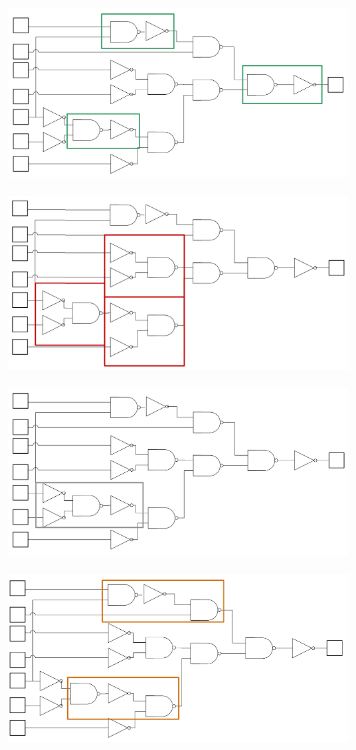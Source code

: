 \documentclass{article}
\begin{document}
\vspace{1cm}
\begin{minipage}[t]{0.5\textwidth}
    \centering
    \includegraphics[width=9cm, scale=1]{S4/and2_pattern.PNG}
    \captionsetup{justification=centering}
\end{minipage}%
\begin{minipage}[t]{0.5\textwidth}
    \centering
    \includegraphics[width=9cm, scale=1]{S4/or2_pattern.PNG}
    \captionsetup{justification=centering}
\end{minipage}%

\vspace{1cm}
\begin{minipage}[t]{0.5\textwidth}
    \centering
    \includegraphics[width=9cm, scale=1]{S4/nor2_pattern.PNG}
    \captionsetup{justification=centering}
\end{minipage}%
\begin{minipage}[t]{0.5\textwidth}
    \centering
    \includegraphics[width=9cm, scale=1]{S4/nand3_pattern.PNG}
    \captionsetup{justification=centering}
\end{minipage}%
\end{document}
